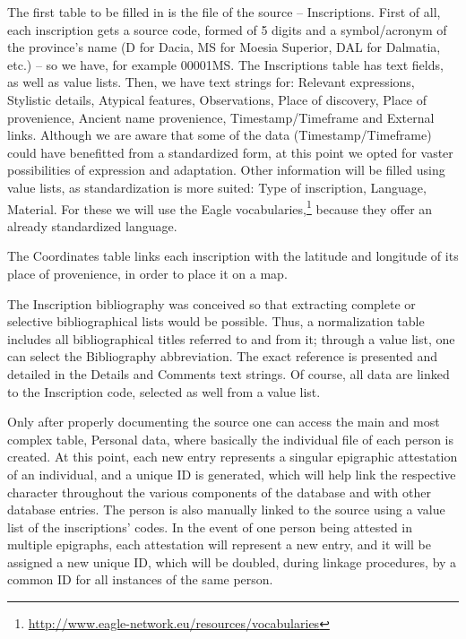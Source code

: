 \documentclass[amsthm,ebook]{saparticle}
\begin{document}
The first table to be filled in is the file of the source – Inscriptions. First of all, each inscription gets a source
code, formed of 5 digits and a symbol/acronym of the province’s name (D for Dacia, MS for Moesia Superior, DAL for
Dalmatia, etc.) – so we have, for example 00001MS. The Inscriptions table has text fields, as well as value lists.
Then, we have text strings for: Relevant expressions, Stylistic details, Atypical features, Observations, Place of
discovery, Place of provenience, Ancient name provenience, Timestamp/Timeframe and External links. Although we are
aware that some of the data (Timestamp/Timeframe) could have benefitted from a standardized form, at this point we
opted for vaster possibilities of expression and adaptation. Other information will be filled using value lists, as
standardization is more suited: Type of inscription, Language, Material. For these we will use the Eagle
vocabularies,\footnote{\url{http://www.eagle-network.eu/resources/vocabularies}} because they offer an already
standardized language.

The Coordinates table links each inscription with the latitude and longitude of its place of provenience, in order to
place it on a map. 

The Inscription bibliography was conceived so that extracting complete or selective bibliographical lists would be
possible. Thus, a normalization table includes all bibliographical titles referred to and from it; through a value
list, one can select the Bibliography abbreviation. The exact reference is presented and detailed in the Details and
Comments text strings. Of course, all data are linked to the Inscription code, selected as well from a value list.

Only after properly documenting the source one can access the main and most complex table, Personal data, where
basically the individual file of each person is created. At this point, each new entry represents a singular epigraphic
attestation of an individual, and a unique ID is generated, which will help link the respective character throughout
the various components of the database and with other database entries. The person is also manually linked to the
source using a value list of the inscriptions’ codes. In the event of one person being attested in
multiple epigraphs, each attestation will represent a new entry, and it will be assigned a new unique ID, which will be
doubled, during linkage procedures, by a common ID for all instances of the same person. 
\end{document}
